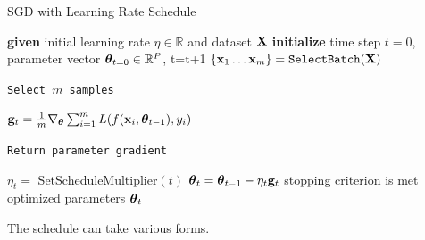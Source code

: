\documentclass[handout,xcolor=pdftex,dvipsnames,table,mathserif]{beamer}
\begin{document}







\begin{frame}{SGD with Learning Rate Schedule}
\begin{algorithm}[H]
\begin{algorithmic}[1]
\STATE \textbf{given} initial learning rate $\eta \in \mathbb{R}$ and dataset $\mathbf{X}$
\STATE \textbf{initialize} time step $t=0$, parameter vector $\boldsymbol{\theta}_{t=0} \in \mathbb{R}^P$,
\REPEAT
\STATE t=t+1
\STATE $\{\mathbf{x}_1 \ldots \mathbf{x}_m\}=\texttt{SelectBatch} (\mathbf{X})$ \begin{tiny}\texttt{Select $m$ samples} \end{tiny}
\STATE $\mathbf{g}_t = \frac{1}{m} \nabla_{\boldsymbol{\theta}} \sum_{i=1}^m L(f(\mathbf{x}_i,\boldsymbol{\theta}_{t-1}), y_i)$  \begin{tiny}\texttt{Return parameter gradient}\end{tiny}
\STATE \alert{$\eta_t = $ SetScheduleMultiplier$(t)$} 
\STATE $\boldsymbol{\theta}_t=\boldsymbol{\theta}_{t-1}  - \eta_t \mathbf{g}_t$
\UNTIL stopping criterion is met
\RETURN optimized parameters $\boldsymbol{\theta}_t$
\end{algorithmic}
\caption{Pseudocode for SGD with Learning Rate Schedule}
\label{alg:schedule}
\end{algorithm}
The schedule can take various forms. 
\end{frame}
\end{document}
